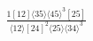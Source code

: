 \documentclass[varwidth, border=5pt]{standalone}
\begin{document}
\begin{my}
$\begin{gathered}
\scriptscriptstyle\frac{1[12]⟨35⟩⟨45⟩^3[25]}{⟨12⟩[24]^2⟨25⟩⟨34⟩^3}
\end{gathered}$
\end{my}
\end{document}
